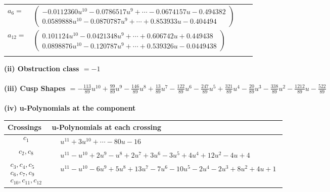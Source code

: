 \documentclass[1p]{elsarticle_modified}
\theoremstyle{definition}
\begin{document}
\begin{tabular}{m{7pt} m{180pt} m{7pt} m{180pt} }
\flushright $a_{6}=$&$\begin{pmatrix}-0.0112360 u^{10}-0.0786517 u^{9}+\cdots-0.0674157 u-0.494382\\0.0589888 u^{10}-0.0870787 u^{9}+\cdots+0.853933 u-0.404494\end{pmatrix}$ \\
\flushright $a_{12}=$&$\begin{pmatrix}0.101124 u^{10}-0.0421348 u^{9}+\cdots+0.606742 u+0.449438\\0.0898876 u^{10}-0.120787 u^{9}+\cdots+0.539326 u-0.0449438\end{pmatrix}$\\&\end{tabular}
\flushleft \textbf{(ii) Obstruction class $= -1$}\\~\\
\flushleft \textbf{(iii) Cusp Shapes $= -\frac{113}{89} u^{10}+\frac{99}{89} u^9-\frac{146}{89} u^8+\frac{13}{89} u^7-\frac{122}{89} u^6-\frac{247}{89} u^5+\frac{321}{89} u^4-\frac{20}{89} u^3-\frac{338}{89} u^2-\frac{1212}{89} u-\frac{522}{89}$}\\~\\
\newpage\renewcommand{\arraystretch}{1}
\flushleft \textbf{(iv) u-Polynomials at the component}\newline \\
\begin{tabular}{m{50pt}|m{274pt}}
Crossings & \hspace{64pt}u-Polynomials at each crossing \\
\hline $$\begin{aligned}c_{1}\end{aligned}$$&$\begin{aligned}
&u^{11}+3 u^{10}+\cdots-80 u-16
\end{aligned}$\\
\hline $$\begin{aligned}c_{2},c_{8}\end{aligned}$$&$\begin{aligned}
&u^{11}- u^{10}+2 u^9- u^8+2 u^7+3 u^6-3 u^5+4 u^4+12 u^2-4 u+4
\end{aligned}$\\
\hline $$\begin{aligned}c_{3},c_{4},c_{5}\\c_{6},c_{7},c_{9}\\c_{10},c_{11},c_{12}\end{aligned}$$&$\begin{aligned}
&u^{11}- u^{10}-6 u^9+5 u^8+13 u^7-7 u^6-10 u^5-2 u^4-2 u^3+8 u^2+4 u+1
\end{aligned}$\\
\hline
\end{tabular}\\~\\
\end{document}

